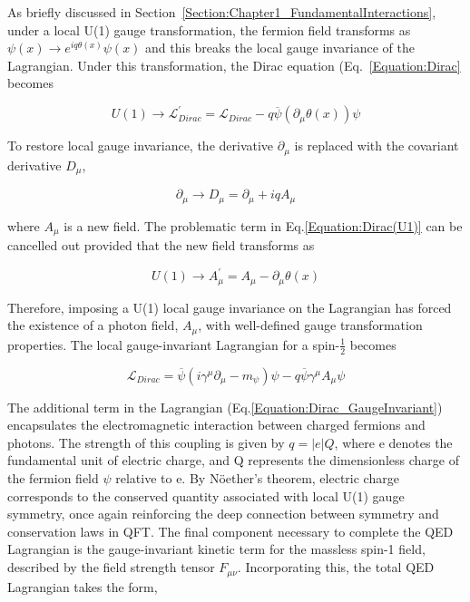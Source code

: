 As briefly discussed in Section~\ref{Section:Chapter1_FundamentalInteractions}, under a local U(1) gauge transformation, the fermion field transforms as $\psi(x) \rightarrow e^{iq\theta(x)} \psi(x)$ and this breaks the local gauge invariance of the Lagrangian. Under this transformation, the Dirac equation (Eq.~\ref{Equation:Dirac} becomes

\begin{equation}
    U(1) \rightarrow \mathcal{L}_{Dirac}^{\prime} = \mathcal{L}_{Dirac} - q\overline{\psi}(\partial_\mu\theta(x))\psi
\label{Equation:Dirac(U1)}
\end{equation}

To restore local gauge invariance, the derivative $\partial_\mu$ is replaced with the covariant derivative $D_\mu$,

\begin{equation}
    \partial_\mu \rightarrow D_\mu = \partial_\mu + iqA_\mu
\end{equation}

where $A_\mu$ is a new field. The problematic term in Eq.\ref{Equation:Dirac(U1)} can be cancelled out provided that the new field transforms as

\begin{equation}
    U(1) \rightarrow A_\mu^{\prime} = A_\mu - \partial_\mu \theta(x) 
\end{equation}

Therefore, imposing a U(1) local gauge invariance on the Lagrangian has forced the existence of a photon field, $A_\mu$, with well-defined gauge transformation properties. The local gauge-invariant Lagrangian for a spin-$\frac{1}{2}$ becomes

\begin{equation}
    \mathcal{L}_{Dirac} = \overline{\psi}(i\gamma^\mu \partial_\mu - m_{\psi}) \psi - q\overline{\psi}\gamma^\mu A_\mu\psi
\label{Equation:Dirac_GaugeInvariant}
\end{equation}

The additional term in the Lagrangian (Eq.\ref{Equation:Dirac_GaugeInvariant}) encapsulates the electromagnetic interaction between charged fermions and photons. The strength of this coupling is given by $q = |e|Q$, where e denotes the fundamental unit of electric charge, and Q represents the dimensionless charge of the fermion field $\psi$ relative to e. By N\"{o}ether's theorem, electric charge corresponds to the conserved quantity associated with local U(1) gauge symmetry, once again reinforcing the deep connection between symmetry and conservation laws in QFT. The final component necessary to complete the QED Lagrangian is the gauge-invariant kinetic term for the massless spin-1 field, described by the field strength tensor $F_{\mu\nu}$. Incorporating this, the total QED Lagrangian takes the form,

